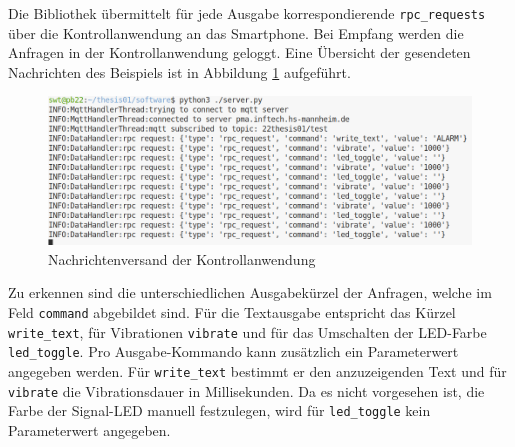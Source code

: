 \documentclass[11pt,a4paper]{report}
\begin{document}
Die Bibliothek übermittelt für jede Ausgabe korrespondierende \texttt{rpc\_requests} über die Kontrollanwendung an das Smartphone.
Bei Empfang werden die Anfragen in der Kontrollanwendung geloggt.
Eine Übersicht der gesendeten Nachrichten des Beispiels ist in Abbildung \ref{fig:req_controll_app} aufgeführt.
\begin{figure}[htbp]
  \centering
  \includegraphics[width=\textwidth]{images/server_requests}
  \caption{Nachrichtenversand der Kontrollanwendung}
  \label{fig:req_controll_app}
\end{figure}
Zu erkennen sind die unterschiedlichen Ausgabekürzel der Anfragen, welche im Feld \texttt{command} abgebildet sind.
Für die Textausgabe entspricht das Kürzel \texttt{write\_text}, für Vibrationen \texttt{vibrate} und für das Umschalten der LED-Farbe \texttt{led\_toggle}.
Pro Ausgabe-Kommando kann zusätzlich ein Parameterwert angegeben werden.
Für \texttt{write\_text} bestimmt er den anzuzeigenden Text und für \texttt{vibrate} die Vibrationsdauer in Millisekunden.
Da es nicht vorgesehen ist, die Farbe der Signal-LED manuell festzulegen, wird für \texttt{led\_toggle} kein Parameterwert angegeben.
\end{document}
